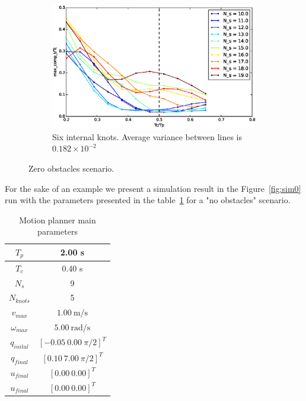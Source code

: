 \begin{figure}[!h]
        ~ %
        \begin{subfigure}[b]{0.48\textwidth}
                \includegraphics[width=\textwidth]{./img/realtime/Scenario_0__N_knots_6/mcttc-tctp.eps}
                \caption{Six internal knots. Average variance between lines is $ 0.182\times 10^{-2}$}\label{fig:uni06}
        \end{subfigure}%
        \caption{Zero obstacles scenario.}\label{fig:uni0}
\end{figure}

For the sake of an example we present a simulation result in the Figure~\ref{fig:sim0} run with the parameters presented in the table~\ref{tab:s0param} for a "no obstacles" scenario.

\begin{table}[!h]
\caption {Motion planner main parameters} \label{tab:s0param}
\begin{center}
\begin{tabular}{|c|c|}
\hline
$T_p$ & 2.00 s\\
\hline 
$T_c$ & 0.40 s\\
\hline 
$N_s$ & 9\\
\hline 
$N_{knots}$ & 5\\
\hline
$v_{max}$ & $1.00\ \mathrm{m/s}$\\
\hline
$\omega_{max}$ & $5.00\ \mathrm{rad/s}$\\
\hline
$q_{inital}$ & $[-0.05\ 0.00\ \pi/2]^T$\\
\hline
$q_{final}$ & $[0.10\ 7.00\ \pi/2]^T$\\
\hline
$u_{final}$ & $[0.00\ 0.00]^T$\\
\hline
$u_{final}$ & $[0.00\ 0.00]^T$\\
\hline
\end{tabular}
\end{center}
\end{table}

